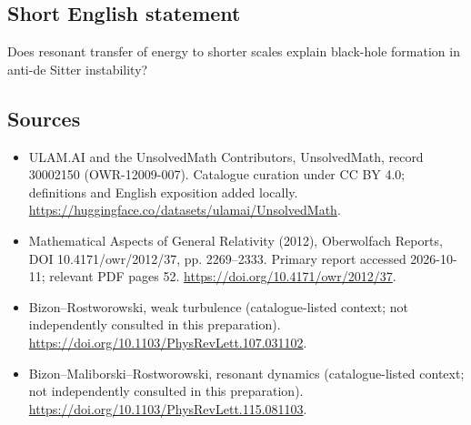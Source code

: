 \documentclass[11pt]{article}
\begin{document}
\subsection{Short English statement}
Does resonant transfer of energy to shorter scales explain black-hole formation in anti-de Sitter instability?
\subsection{Sources}
\begin{itemize}
\item[\hypertarget{source:30002150:1}{S1}] ULAM.AI and the UnsolvedMath Contributors, UnsolvedMath, record 30002150 (OWR-12009-007). Catalogue curation under CC BY 4.0; definitions and English exposition added locally.
\url{https://huggingface.co/datasets/ulamai/UnsolvedMath}.
\item[\hypertarget{source:30002150:2}{S2}] Mathematical Aspects of General Relativity (2012), Oberwolfach Reports, DOI 10.4171/owr/2012/37, pp. 2269--2333. Primary report accessed 2026-10-11; relevant PDF pages 52.
\url{https://doi.org/10.4171/owr/2012/37}.
\item[\hypertarget{source:30002150:3}{S3}] Bizon--Rostworowski, weak turbulence (catalogue-listed context; not independently consulted in this preparation).
\url{https://doi.org/10.1103/PhysRevLett.107.031102}.
\item[\hypertarget{source:30002150:4}{S4}] Bizon--Maliborski--Rostworowski, resonant dynamics (catalogue-listed context; not independently consulted in this preparation).
\url{https://doi.org/10.1103/PhysRevLett.115.081103}.
\end{itemize}
\label{end:30002150}
\end{document}
